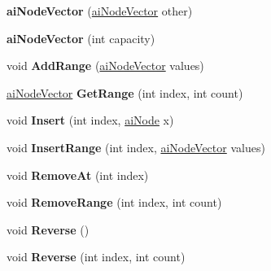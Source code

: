 \begin{DoxyCompactItemize}
\item 
\hypertarget{classai_node_vector_a08672f4569cd6f8a6d5f7eff52e1f90a}{{\bfseries ai\+Node\+Vector} (\hyperlink{classai_node_vector}{ai\+Node\+Vector} other)}\label{classai_node_vector_a08672f4569cd6f8a6d5f7eff52e1f90a}

\item 
\hypertarget{classai_node_vector_a63cdb1e0f98cf9e7564fd08d011f8a5f}{{\bfseries ai\+Node\+Vector} (int capacity)}\label{classai_node_vector_a63cdb1e0f98cf9e7564fd08d011f8a5f}

\item 
\hypertarget{classai_node_vector_a49e3cb7780882b22d16c72d81d79fca7}{void {\bfseries Add\+Range} (\hyperlink{classai_node_vector}{ai\+Node\+Vector} values)}\label{classai_node_vector_a49e3cb7780882b22d16c72d81d79fca7}

\item 
\hypertarget{classai_node_vector_aec4d294426086de1c22a83d8ebcca668}{\hyperlink{classai_node_vector}{ai\+Node\+Vector} {\bfseries Get\+Range} (int index, int count)}\label{classai_node_vector_aec4d294426086de1c22a83d8ebcca668}

\item 
\hypertarget{classai_node_vector_ac800f37c587b946e7f4daefc67f8dc87}{void {\bfseries Insert} (int index, \hyperlink{structai_node}{ai\+Node} x)}\label{classai_node_vector_ac800f37c587b946e7f4daefc67f8dc87}

\item 
\hypertarget{classai_node_vector_a57e2fd45b3f1daf8bafdf266f4d6023c}{void {\bfseries Insert\+Range} (int index, \hyperlink{classai_node_vector}{ai\+Node\+Vector} values)}\label{classai_node_vector_a57e2fd45b3f1daf8bafdf266f4d6023c}

\item 
\hypertarget{classai_node_vector_a26fa46f4a497f5637b9e95a698e1015c}{void {\bfseries Remove\+At} (int index)}\label{classai_node_vector_a26fa46f4a497f5637b9e95a698e1015c}

\item 
\hypertarget{classai_node_vector_a4bcddf443b72ed5105eeaef003d36df4}{void {\bfseries Remove\+Range} (int index, int count)}\label{classai_node_vector_a4bcddf443b72ed5105eeaef003d36df4}

\item 
\hypertarget{classai_node_vector_a7118a138abfb0e683e7790e181a54412}{void {\bfseries Reverse} ()}\label{classai_node_vector_a7118a138abfb0e683e7790e181a54412}

\item 
\hypertarget{classai_node_vector_a5faf4c51215d306d8318e73ff53489ef}{void {\bfseries Reverse} (int index, int count)}\label{classai_node_vector_a5faf4c51215d306d8318e73ff53489ef}


\end{DoxyCompactItemize}
